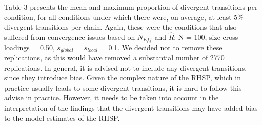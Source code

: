 \documentclass[
  man, donotrepeattitle,floatsintext]{apa6}
\begin{document}
Table 3 presents the mean and maximum proportion of divergent transitions per condition, for all conditions under which there were, on average, at least 5\% divergent transitions per chain. Again, these were the conditions that also suffered from convergence issues based on \(N_{Eff}\) and \(\hat{R}\): N = 100, size cross-loadings = 0.50, \(s_{global}\) = \(s_{local}\) = 0.1. We decided not to remove these replications, as this would have removed a substantial number of 2770 replications. In general, it is advised not to include any divergent transitions, since they introduce bias. Given the complex nature of the RHSP, which in practice usually leads to some divergent transitions, it is hard to follow this advise in practice. However, it needs to be taken into account in the interpretation of the findings that the divergent transitions may have added bias to the model estimates of the RHSP.
\end{document}
